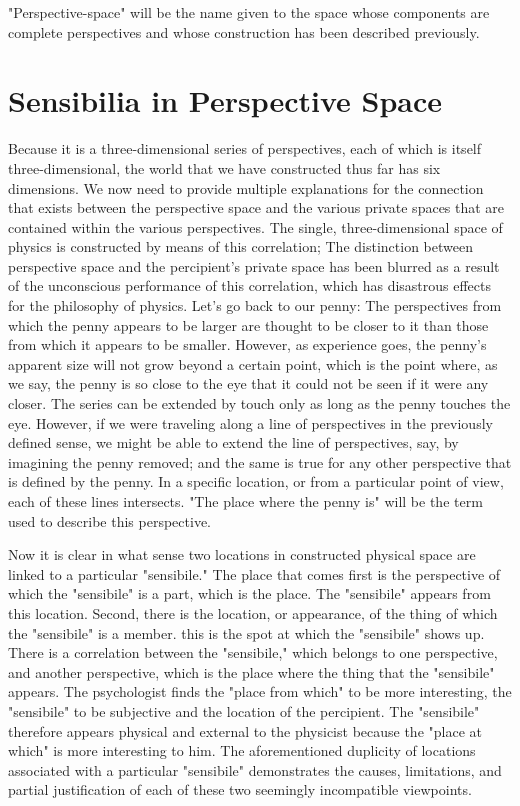 \documentclass[a4paper,12pt]{book}[2004/02/16]
\theoremstyle{ilemma}
\theoremstyle{itheorem}
\theoremstyle{iother}
\theoremstyle{icorollary}
\theoremstyle{numcorollary}
\theoremstyle{idefinition}
\begin{document}
"Perspective-space" will be the name given to the space whose components are complete perspectives and whose construction has been described previously.

\section{Sensibilia in Perspective Space}
Because it is a three-dimensional series of perspectives, each of which is itself three-dimensional, the world that we have constructed thus far has six dimensions. We now need to provide multiple explanations for the connection that exists between the perspective space and the various private spaces that are contained within the various perspectives. The single, three-dimensional space of physics is constructed by means of this correlation; The distinction between perspective space and the percipient's private space has been blurred as a result of the unconscious performance of this correlation, which has disastrous effects for the philosophy of physics. Let's go back to our penny: The perspectives from which the penny appears to be larger are thought to be closer to it than those from which it appears to be smaller. However, as experience goes, the penny's apparent size will not grow beyond a certain point, which is the point where, as we say, the penny is so close to the eye that it could not be seen if it were any closer. The series can be extended by touch only as long as the penny touches the eye. However, if we were traveling along a line of perspectives in the previously defined sense, we might be able to extend the line of perspectives, say, by imagining the penny removed; and the same is true for any other perspective that is defined by the penny. In a specific location, or from a particular point of view, each of these lines intersects. "The place where the penny is" will be the term used to describe this perspective.

Now it is clear in what sense two locations in constructed physical space are linked to a particular "sensibile." The place that comes first is the perspective of which the "sensibile" is a part, which is the place.
The "sensibile" appears from this location. Second, there is the location, or appearance, of the thing of which the "sensibile" is a member. this is the spot at which the
"sensibile" shows up. There is a correlation between the "sensibile," which belongs to one perspective, and another perspective, which is the place where the thing that the "sensibile" appears. The psychologist finds the "place from which" to be more interesting, the "sensibile" to be subjective and the location of the percipient. The "sensibile" therefore appears physical and external to the physicist because the "place at which" is more interesting to him. The aforementioned duplicity of locations associated with a particular "sensibile" demonstrates the causes, limitations, and partial justification of each of these two seemingly incompatible viewpoints.
\end{document}
